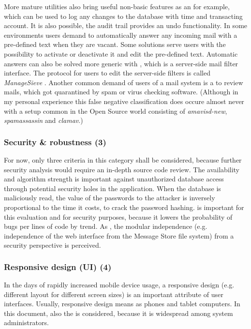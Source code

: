 \documentclass[12pt,a4paper]{scrartcl}
\begin{document}
				More mature utilities also bring useful non-basic features as
				an  for example, which can be used to
				log any changes to the database with time and transacting
				account. It is also possible, the audit trail provides an undo
				functionality. In some environments users demand  to automatically answer any incoming mail with
				a pre-defined text when they are vacant. Some solutions serve
				users with the possibility to activate or deactivate it and
				edit the pre-defined text. Automatic answers can also be solved
				more generic with  \cite{sieve}, which is a
				server-side mail filter interface. The protocol for users to
				edit the server-side filters is called \emph{ManageSieve}
				\cite{managesieve}. Another common demand of users of a mail
				system is a  to review mails, which
				got quarantined by spam or virus checking software. (Although in
				my personal experience this false negative classification does
				occure almost never with a setup common in the Open Source
				world consisting of \emph{amavisd-new}, \emph{spamassassin} and
				\emph{clamav}.)

			\subsubsection*{Security \& robustness (3)}
				For now, only three criteria in this category shall be
				considered, because further security analysis would require an
				in-depth source code review. The 
				availability and algorithm strength is important against
				unauthorized database access through potential security holes
				in the application. When the database is maliciously read, the
				value of the passwords to the attacker is inversely
				proportional to the time it costs, to crack the password
				hashing.  is important for this
				evaluation and for security purposes, because it lowers the
				probability of bugs per lines of code by trend. As
				, the modular independence (e.g.
				independence of the web interface from the Message Store file
				system) from a security perspective is perceived.

			\subsubsection*{Responsive design (UI) (4)}
				In the days of rapidly increased mobile device usage, a
				responsive design (e.g. different layout for different screen
				sizes) is an important attribute of user interfaces. Usually,
				responsive design means 
				as phones and tablet computers. In this document, also the
				 is considered,
				because it is widespread among system administrators.
\end{document}
